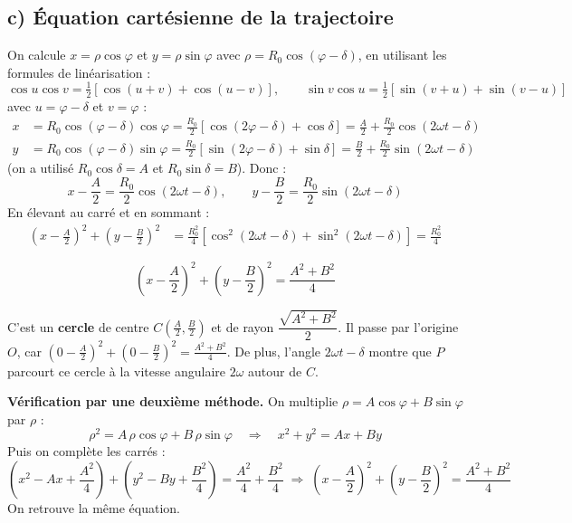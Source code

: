 \documentclass[11pt,a4paper]{article}
\begin{document}
\subsection*{c) Équation cartésienne de la trajectoire}
On calcule $x=\rho\cos\varphi$ et $y=\rho\sin\varphi$ avec $\rho=R_0\cos(\varphi-\delta)$, en utilisant les formules de linéarisation :
$$ \cos u\cos v = \tfrac{1}{2}\left[\cos(u+v)+\cos(u-v)\right], \qquad \sin v\cos u = \tfrac{1}{2}\left[\sin(v+u)+\sin(v-u)\right] $$
avec $u=\varphi-\delta$ et $v=\varphi$ :
\begin{align*}
x &= R_0\cos(\varphi-\delta)\cos\varphi = \frac{R_0}{2}\left[\cos(2\varphi-\delta) + \cos\delta\right] = \frac{A}{2} + \frac{R_0}{2}\cos(2\omega t-\delta) \\
y &= R_0\cos(\varphi-\delta)\sin\varphi = \frac{R_0}{2}\left[\sin(2\varphi-\delta) + \sin\delta\right] = \frac{B}{2} + \frac{R_0}{2}\sin(2\omega t-\delta)
\end{align*}
(on a utilisé $R_0\cos\delta=A$ et $R_0\sin\delta=B$). Donc :
$$ x - \frac{A}{2} = \frac{R_0}{2}\cos(2\omega t - \delta), \qquad y - \frac{B}{2} = \frac{R_0}{2}\sin(2\omega t - \delta) $$
En élevant au carré et en sommant :
\begin{align*}
\left(x-\frac{A}{2}\right)^2 + \left(y-\frac{B}{2}\right)^2 &= \frac{R_0^2}{4}\left[\cos^2(2\omega t-\delta) + \sin^2(2\omega t-\delta)\right] = \frac{R_0^2}{4}
\end{align*}
\begin{sonucbox}
$$ \left(x-\frac{A}{2}\right)^2 + \left(y-\frac{B}{2}\right)^2 = \frac{A^2+B^2}{4} $$
\end{sonucbox}
C'est un \textbf{cercle} de centre $C\left(\frac{A}{2},\frac{B}{2}\right)$ et de rayon $\dfrac{\sqrt{A^2+B^2}}{2}$. Il passe par l'origine $O$, car $\left(0-\frac{A}{2}\right)^2 + \left(0-\frac{B}{2}\right)^2 = \frac{A^2+B^2}{4}$. De plus, l'angle $2\omega t-\delta$ montre que $P$ parcourt ce cercle à la vitesse angulaire $2\omega$ autour de $C$.

\textbf{Vérification par une deuxième méthode.} On multiplie $\rho = A\cos\varphi + B\sin\varphi$ par $\rho$ :
$$ \rho^2 = A\,\rho\cos\varphi + B\,\rho\sin\varphi \quad\Longrightarrow\quad x^2 + y^2 = Ax + By $$
Puis on complète les carrés :
$$ \left(x^2 - Ax + \frac{A^2}{4}\right) + \left(y^2 - By + \frac{B^2}{4}\right) = \frac{A^2}{4} + \frac{B^2}{4} \;\Longrightarrow\; \left(x-\frac{A}{2}\right)^2 + \left(y-\frac{B}{2}\right)^2 = \frac{A^2+B^2}{4} $$
On retrouve la même équation.
\end{document}
